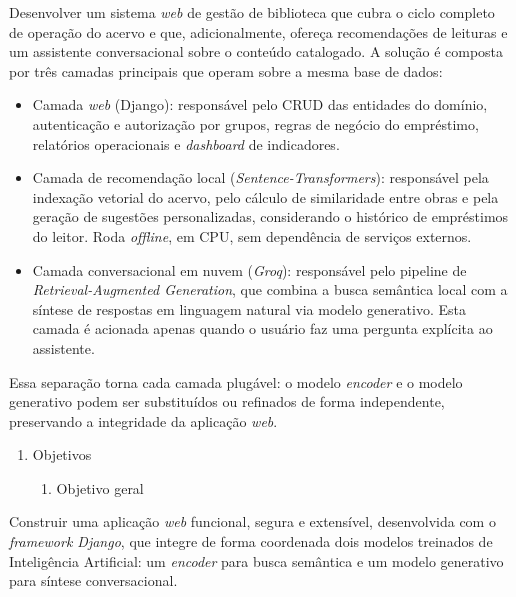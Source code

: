 \documentclass[
]{article}
\begin{document}
Desenvolver um sistema \emph{web} de gestão de biblioteca que cubra o
ciclo completo de operação do acervo e que, adicionalmente, ofereça
recomendações de leituras e um assistente conversacional sobre o
conteúdo catalogado. A solução é composta por três camadas principais
que operam sobre a mesma base de dados:

\begin{itemize}
\item
  Camada \emph{web} (Django): responsável pelo CRUD das entidades do
  domínio, autenticação e autorização por grupos, regras de negócio do
  empréstimo, relatórios operacionais e \emph{dashboard} de indicadores.
\item
  Camada de recomendação local (\emph{Sentence-Transformers}):
  responsável pela indexação vetorial do acervo, pelo cálculo de
  similaridade entre obras e pela geração de sugestões personalizadas,
  considerando o histórico de empréstimos do leitor. Roda
  \emph{offline}, em CPU, sem dependência de serviços externos.
\item
  Camada conversacional em nuvem (\emph{Groq}): responsável pelo
  pipeline de \emph{Retrieval-Augmented Generation}, que combina a busca
  semântica local com a síntese de respostas em linguagem natural via
  modelo generativo. Esta camada é acionada apenas quando o usuário faz
  uma pergunta explícita ao assistente.
\end{itemize}

Essa separação torna cada camada plugável: o modelo \emph{encoder} e o
modelo generativo podem ser substituídos ou refinados de forma
independente, preservando a integridade da aplicação \emph{web}.

\begin{enumerate}
\def\labelenumi{\arabic{enumi}.}
\item
  \protect{}\label{_Toc230227806}{}Objetivos

  \begin{enumerate}
  \def\labelenumii{\arabic{enumii}.}
  \item
    \protect{}\label{_Toc230227807}{}Objetivo geral
  \end{enumerate}
\end{enumerate}

Construir uma aplicação \emph{web} funcional, segura e extensível,
desenvolvida com o \emph{framework Django}, que integre de forma
coordenada dois modelos treinados de Inteligência Artificial: um
\emph{encoder} para busca semântica e um modelo generativo para síntese
conversacional.
\end{document}

